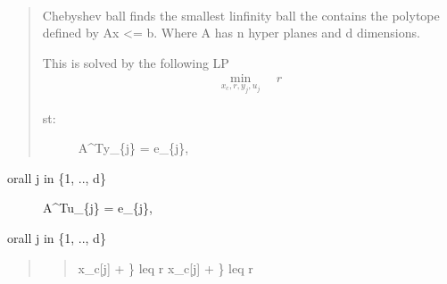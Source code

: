 \documentclass[letterpaper,10pt,english]{sphinxmanual}
\begin{document}

\begin{fulllineitems}
\label{\detokenize{ppopt.utils:ppopt.utils.chebyshev_ball.chebyshev_ball_max}}~\begin{quote}

\sphinxAtStartPar
Chebyshev ball finds the smallest l\sphinxhyphen{}infinity ball the contains the polytope defined by Ax \textless{}= b. Where A has n hyper planes and d dimensions.

\sphinxAtStartPar
This is solved by the following LP
\begin{equation*}
\begin{split}\min_{x_{c} ,r ,y_{j} ,u_{j}} \quad r\end{split}
\end{equation*}\begin{description}
\item[{st:}] \leavevmode
\sphinxAtStartPar
A\textasciicircum{}Ty\_\{j\} = e\_\{j\},

\end{description}
\end{quote}
\begin{description}
\item[{orall j in \{1, .., d\}}] \leavevmode
\sphinxAtStartPar
A\textasciicircum{}Tu\_\{j\} = \sphinxhyphen{}e\_\{j\},

\end{description}

\sphinxAtStartPar
orall j in \{1, .., d\}
\begin{quote}
\begin{quote}

\sphinxAtStartPar
\sphinxhyphen{}x\_c{[}j{]} + \} leq r
x\_c{[}j{]} + \} leq r


\end{quote}
\end{quote}
\end{fulllineitems}
\end{document}
